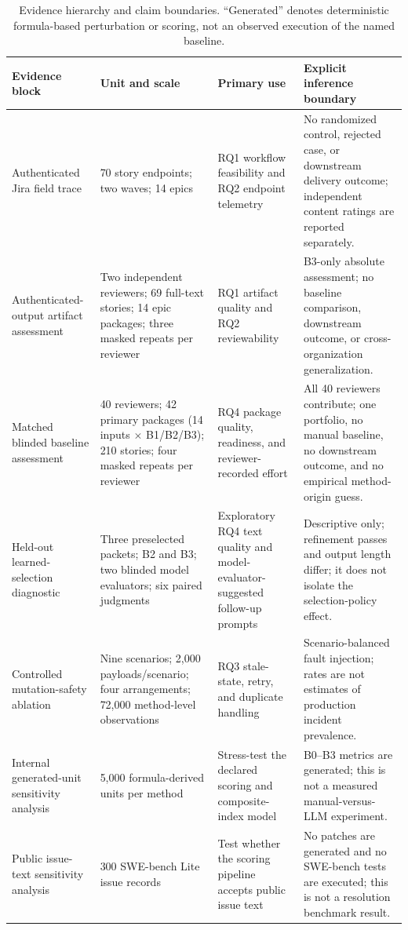 \documentclass[pdflatex,sn-basic]{sn-jnl}
\begin{document}
\begin{table}[t]
\centering
\footnotesize
\caption{Evidence hierarchy and claim boundaries. ``Generated'' denotes deterministic formula-based perturbation or scoring, not an observed execution of the named baseline.}
\label{tab:evidence-hierarchy}
\begin{tabularx}{\textwidth}{@{}p{}p{}p{}X@{}}
\toprule
Evidence block & Unit and scale & Primary use & Explicit inference boundary \\
\midrule
Authenticated Jira field trace & 70 story endpoints; two waves; 14 epics & RQ1 workflow feasibility and RQ2 endpoint telemetry & No randomized control, rejected case, or downstream delivery outcome; independent content ratings are reported separately. \\
Authenticated-output artifact assessment & Two independent reviewers; 69 full-text stories; 14 epic packages; three masked repeats per reviewer & RQ1 artifact quality and RQ2 reviewability & B3-only absolute assessment; no baseline comparison, downstream outcome, or cross-organization generalization. \\
Matched blinded baseline assessment & 40 reviewers; 42 primary packages (14 inputs $\times$ B1/B2/B3); 210 stories; four masked repeats per reviewer & RQ4 package quality, readiness, and reviewer-recorded effort & All 40 reviewers contribute; one portfolio, no manual baseline, no downstream outcome, and no empirical method-origin guess. \\
Held-out learned-selection diagnostic & Three preselected packets; B2 and B3; two blinded model evaluators; six paired judgments & Exploratory RQ4 text quality and model-evaluator-suggested follow-up prompts & Descriptive only; refinement passes and output length differ; it does not isolate the selection-policy effect. \\
Controlled mutation-safety ablation & Nine scenarios; 2,000 payloads/scenario; four arrangements; 72,000 method-level observations & RQ3 stale-state, retry, and duplicate handling & Scenario-balanced fault injection; rates are not estimates of production incident prevalence. \\
Internal generated-unit sensitivity analysis & 5,000 formula-derived units per method & Stress-test the declared scoring and composite-index model & B0--B3 metrics are generated; this is not a measured manual-versus-LLM experiment. \\
Public issue-text sensitivity analysis & 300 SWE-bench Lite issue records & Test whether the scoring pipeline accepts public issue text & No patches are generated and no SWE-bench tests are executed; this is not a resolution benchmark result. \\
\bottomrule
\end{tabularx}
\end{table}
\end{document}
